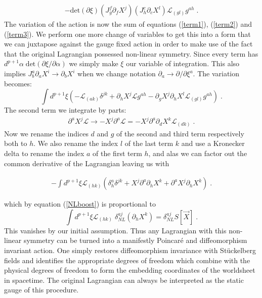\documentclass[%
 reprint,
 amsmath,amssymb,
 aps,
]{revtex4-1}
\begin{document}
\begin{eqnarray}
\label{term3}
    - \mathrm{det} ( \partial \xi ) ( J^f_g \partial_f X^j )
    ( J^c_h \partial_{c} X^l ) \mathcal{L}_{(g l)} g^{a h} \; .
\end{eqnarray}
The variation of the action is now the sum of equations (\ref{term1}), (\ref{term2}) and (\ref{term3}).  We perform one more change
of variables to get this into a form that we can juxtapose against the gauge fixed action in order to
make use of the fact that the original Lagrangian possessed non-linear symmetry.  Since
every term has $d^{p+1} \alpha\;\mathrm{det}\left( \partial \xi/\partial \alpha\right)$ we simply make $\xi$
our variable of integration. This also implies $J^a_b \partial_a X^i \rightarrow \partial_b X^i$ when we change notation $\partial_a \rightarrow \partial/\partial \xi^a$.
The variation becomes:
\begin{equation}
\label{diffeq}
    \int d^{p+1} \xi \left(
    -\mathcal{L}_{(a k)} \delta^{j k}
    + \partial_h X^j \mathcal{L} g^{a h}
    - \partial_g X^j \partial_h X^l \mathcal{L}_{(g l)} g^{a h} \right) \; .
\end{equation}
The second term we integrate by parts:
\begin{gather}
    \partial^a X^j \mathcal{L} \rightarrow
    - X^j \partial^a \mathcal{L} = - X^j \partial^a \partial_d X^k \mathcal{L}_{(d k)} \; . \nonumber
\end{gather}
Now we rename the indices $d$ and $g$ of the second and third term respectively both to $h$. We also
rename the index $l$ of the last term $k$ and use a Kronecker delta to rename the index
$a$ of the first term $h$, and alas we can factor out the common derivative of
the Lagrangian leaving us with
\begin{widetext}
    \begin{eqnarray}
        -\int d^{p+1} \xi \mathcal{L}_{(h k)}
        \left( \delta^a_h \delta^{j k} + X^j \partial^a \partial_h X^k
        + \partial^a X^j \partial_h X^k \right) \; . \nonumber
    \end{eqnarray}
\end{widetext}
which by equation (\ref{NLboost}) is proportional to
\begin{equation}
    \int d^{p+1} \xi \mathcal{L}_{(h k)} \; \delta^{a j}_{NL} (\partial_h X^k)
    = \delta^{a j}_{NL} S[\vec{X}] \; .
\end{equation}
This vanishes by our initial assumption. Thus any Lagrangian with this non-linear symmetry can be turned into a
manifestly Poincar\'{e} and diffeomorphism invariant action. One simply restores diffeomorphism invariance
with St\"uckelberg fields and identifies the appropriate degrees of freedom which combine with the physical
degrees of freedom to form the embedding coordinates of the worldsheet in spacetime. The original
Lagrangian can always be interpreted as the static gauge of this procedure.
\end{document}
